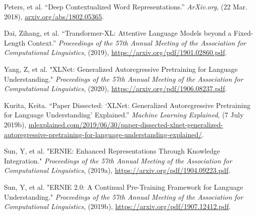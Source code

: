 \begin{frame}{}

    \begin{enumerateSpaced}{3pt}
    
        \scriptsize
        \setcounter{enumi}{21}
        
    
        \item Peters, et al. “Deep Contextualized Word Representations.” \emph{ArXiv.org}, (22 Mar. 2018), \url{arxiv.org/abs/1802.05365}.
        
        \item Dai, Zihang, et al. “Transformer-XL: Attentive Language Models beyond a Fixed-Length Context.” \emph{Proceedings of the 57th Annual Meeting of the Association for Computational Linguistics}, (2019), \url{https://arxiv.org/pdf/1901.02860.pdf}.
        
        \item Yang, Z, et al. "XLNet: Generalized Autoregressive Pretraining for Language Understanding." \emph{Proceedings of the 57th Annual Meeting of the Association for Computational Linguistics}, (2020), \url{https://arxiv.org/pdf/1906.08237.pdf}.
        
        \item Kurita, Keita. “Paper Dissected: ‘XLNet: Generalized Autoregressive Pretraining for Language Understanding’ Explained.” \emph{Machine Learning Explained}, (7 July 2019b), \url{mlexplained.com/2019/06/30/paper-dissected-xlnet-generalized-autoregressive-pretraining-for-language-understanding-explained/}.
        
        
        \item Sun, Y, et al. "ERNIE: Enhanced Representations Through Knowledge Integration." \emph{Proceedings of the 57th Annual Meeting of the Association for Computational Linguistics}, (2019a), \url{https://arxiv.org/pdf/1904.09223.pdf}.
        
        \item Sun, Y, et al. "ERNIE 2.0: A Continual Pre-Training Framework for Language Understanding." \emph{Proceedings of the 57th Annual Meeting of the Association for Computational Linguistics}, (2019b), \url{https://arxiv.org/pdf/1907.12412.pdf}.
        
        
        
    \end{enumerateSpaced}
    
\end{frame}